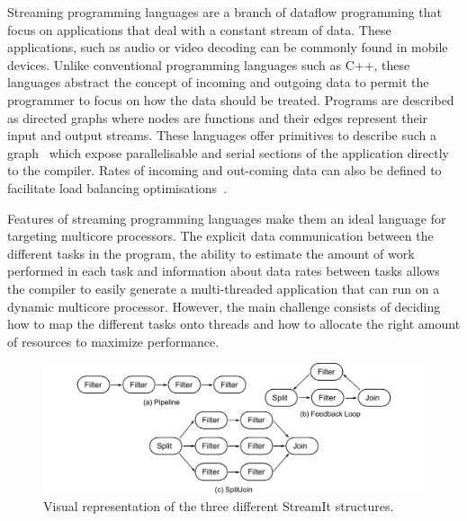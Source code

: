 
Streaming programming languages are a branch of dataflow programming that focus on applications that deal with a constant stream of data.
These applications, such as audio or video decoding can be commonly found in mobile devices.
Unlike conventional programming languages such as C++, these languages abstract the concept of incoming and outgoing data to permit the programmer to focus on how the data should be treated.
Programs are described as directed graphs where nodes are functions and their edges represent their input and output streams. 
These languages offer primitives to describe such a graph~\cite{theis2002streamit} which expose parallelisable and serial sections of the application directly to the compiler. 
Rates of incoming and out-coming data can also be defined to facilitate load balancing optimisations~\cite{chen2005rawstream}.

Features of streaming programming languages make them an ideal language for targeting multicore processors.
The explicit data communication between the different tasks in the program, the ability to estimate the amount of work performed in each task and information about data rates between tasks allows the compiler to easily generate a multi-threaded application that can run on a dynamic multicore processor.
However, the main challenge consists of deciding how to map the different tasks onto threads and how to allocate the right amount of resources to maximize performance.


\begin{figure}[t]
    \centering
    \includegraphics[width=1\textwidth]{streamit-paper/graphics/streamit_types.pdf}
    \caption{Visual representation of the three different StreamIt structures.}
    \label{fig:streamittypes}
\end{figure}

